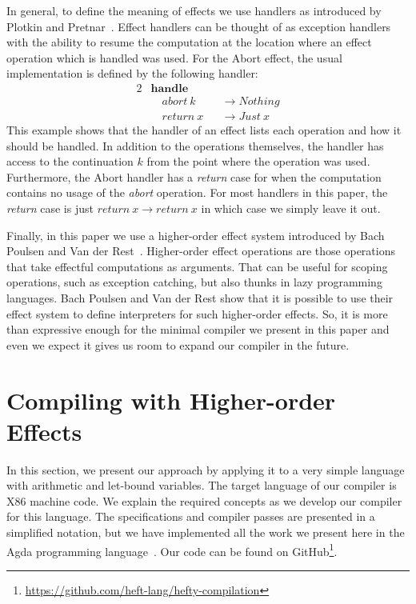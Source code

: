 \documentclass[a4paper,UKenglish,cleveref, autoref, thm-restate]{oasics-v2021}
\begin{document}
In general, to define the meaning of effects we use handlers as introduced by Plotkin and Pretnar~\cite{10.1007/978-3-642-00590-9_7}.
Effect handlers can be thought of as exception handlers with the ability to resume the computation at the location where an effect operation which is handled was used.
For the Abort effect, the usual implementation is defined by the following handler:
\begin{alignat*}{2}
  & \mathbf{handle} && \\
  & \quad\mathit{abort}~k && \to \mathit{Nothing} \\
  & \quad\mathit{return}~x && \to \mathit{Just}~x
\end{alignat*}
This example shows that the handler of an effect lists each operation and how it should be handled.
In addition to the operations themselves, the handler has access to the continuation $k$ from the point where the operation was used.
Furthermore, the Abort handler has a \textit{return} case for when the computation contains no usage of the \textit{abort} operation.
For most handlers in this paper, the \textit{return} case is just $\textit{return}~x \to \textit{return}~x$ in which case we simply leave it out.

Finally, in this paper we use a higher-order effect system introduced by Bach Poulsen and Van der Rest~\cite{10.1145/3571255}.
Higher-order effect operations are those operations that take effectful computations as arguments.
That can be useful for scoping operations, such as exception catching, but also thunks in lazy programming languages.
Bach Poulsen and Van der Rest show that it is possible to use their effect system to define interpreters for such higher-order effects.
So, it is more than expressive enough for the minimal compiler we present in this paper and even we expect it gives us room to expand our compiler in the future.

\section{Compiling with Higher-order Effects}\label{sec:compiling}

In this section, we present our approach by applying it to a very simple language with arithmetic and let-bound variables.
The target language of our compiler is X86 machine code.
We explain the required concepts as we develop our compiler for this language.
The specifications and compiler passes are presented in a simplified notation, but we have implemented all the work we present here in the Agda programming language~\cite{10.1007/978-3-642-03359-9_6}.
Our code can be found on GitHub\footnote{\url{https://github.com/heft-lang/hefty-compilation}}.
\end{document}
